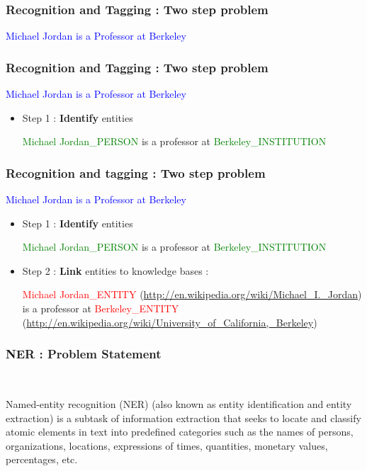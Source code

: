 
\begin{frame}
 \frametitle{Recognition and Tagging : Two step problem}
 \begin{center}
\textcolor{blue}{Michael Jordan is a Professor at Berkeley}
   \end{center}

\end{frame}

\begin{frame}
 \frametitle{Recognition and Tagging : Two step problem}
 \begin{center}
\textcolor{blue}{Michael Jordan is a Professor at Berkeley}
   \end{center}

 \begin{itemize}  
  \item Step 1 : \textbf{Identify} entities

  \medskip
  \textcolor{green}{Michael Jordan\_PERSON} is a professor at \textcolor{green}{Berkeley\_INSTITUTION} \medskip
  
\end{itemize}
\end{frame}

\begin{frame}
 \frametitle{Recognition and tagging : Two step problem}
 \begin{center}
\textcolor{blue}{Michael Jordan is a Professor at Berkeley}
   \end{center}

 \begin{itemize}  
  \item Step 1 : \textbf{Identify} entities
  \medskip
  
  \textcolor{green}{Michael Jordan\_PERSON} is a professor at \textcolor{green}{Berkeley\_INSTITUTION} \medskip
  \item Step 2 : \textbf{Link} entities to knowledge bases : 
  \medskip
  
  \textcolor{red}{Michael Jordan\_ENTITY} (\url{http://en.wikipedia.org/wiki/Michael_I._Jordan})  is a professor at  
  \textcolor{red}{Berkeley\_ENTITY} (\url{http://en.wikipedia.org/wiki/University_of_California,_Berkeley})
\end{itemize}

\end{frame}

\begin{frame}
\frametitle{NER : Problem Statement}
 \begin{center}
\  \begin{definition}
   Named-entity recognition (NER) (also known as entity identification and entity extraction) is a subtask of information extraction that seeks to locate and classify 
   atomic elements in text into predefined categories such as the names of persons, organizations, locations, expressions of times, quantities, monetary values, percentages, etc.
  \end{definition}

 \end{center}
\end{frame}

